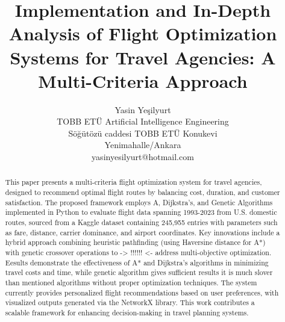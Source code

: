 \documentclass[conference]{IEEEtran}
\begin{document}
\title{Implementation and In-Depth Analysis of Flight Optimization Systems for Travel Agencies: A Multi-Criteria Approach}

\author{Yasin Yeşilyurt\\
TOBB ETÜ Artificial Intelligence
Engineering\\
Söğütözü caddesi TOBB ETÜ Konukevi\\
Yenimahalle/Ankara\\
yasinyesilyurt@hotmail.com}

\maketitle


\begin{abstract}
This paper presents a multi-criteria flight optimization system for travel agencies, designed to recommend optimal flight routes by balancing cost, duration, and customer satisfaction. 
The proposed framework employs A, Dijkstra's, and Genetic Algorithms implemented in Python to evaluate flight data spanning 1993-2023 from U.S. domestic routes, sourced from a Kaggle dataset containing 245,955 entries with parameters such as fare, distance, carrier dominance, and airport coordinates. 
Key innovations include a hybrid approach combining heuristic pathfinding (using Haversine distance for A*) with genetic crossover operations to -> !!!!!! <- address multi-objective optimization. 
Eesults demonstrate the effectiveness of A* and Dijkstra's algorithms in minimizing travel costs and time, while genetic algorithm gives sufficient results it is much slover than mentioned algorithms without proper optimization techniques. 
The system currently provides personalized flight recommendations based on user preferences, with visualized outputs generated via the NetworkX library.
This work contributes a scalable framework for enhancing decision-making in travel planning systems.
\end{abstract}
\end{document}
